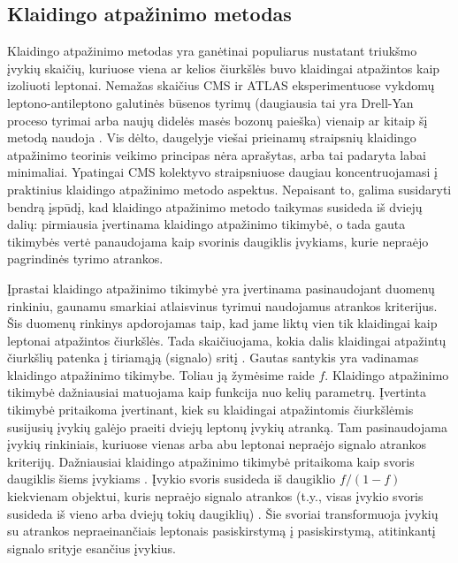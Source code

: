 \documentclass[a4paper, 12pt, oneside]{article}
\begin{document}
\subsection{Klaidingo atpažinimo metodas}
Klaidingo atpažinimo metodas yra ganėtinai populiarus nustatant triukšmo įvykių skaičių, kuriuose viena ar kelios čiurkšlės
buvo klaidingai atpažintos kaip izoliuoti leptonai.
Nemažas skaičius CMS ir ATLAS eksperimentuose vykdomų leptono-antileptono galutinės būsenos tyrimų (daugiausia tai yra
Drell-Yan proceso tyrimai arba naujų didelės masės bozonų paieška) vienaip ar kitaip šį metodą naudoja
\cite{DY_CMS2011, DY_CMS2013, DY_ATLAS2013, DY_CMS2015, DY_ATLAS2016, DY_CMS2019, Z'_ATLAS2011, Z'_CMS2011, Z'_CMS2012,
Z'_CMS2013, Z'_ATLAS2014, Z'_CMS2015, Z'_CMS2017, Z'_CMS2018}.
Vis dėlto, daugelyje viešai prieinamų straipsnių klaidingo atpažinimo teorinis veikimo principas nėra aprašytas, arba tai padaryta
labai minimaliai.
Ypatingai CMS kolektyvo straipsniuose daugiau koncentruojamasi į praktinius klaidingo atpažinimo metodo aspektus.
Nepaisant to, galima susidaryti bendrą įspūdį, kad klaidingo atpažinimo metodo taikymas susideda iš dviejų dalių:
pirmiausia įvertinama klaidingo atpažinimo tikimybė, o tada gauta tikimybės vertė panaudojama kaip svorinis
daugiklis įvykiams, kurie nepraėjo pagrindinės tyrimo atrankos.

Įprastai klaidingo atpažinimo tikimybė yra įvertinama pasinaudojant duomenų rinkiniu, gaunamu smarkiai atlaisvinus
tyrimui naudojamus atrankos kriterijus.
Šis duomenų rinkinys apdorojamas taip, kad jame liktų vien tik klaidingai kaip leptonai atpažintos čiurkšlės.
Tada skaičiuojama, kokia dalis klaidingai atpažintų čiurkšlių patenka į tiriamąją (signalo) sritį
\cite{DY_ATLAS2016, Z'_ATLAS2011, Z'_CMS2011, Z'_ATLAS2014, Z'_CMS2015}.
Gautas santykis yra vadinamas klaidingo atpažinimo tikimybe.
Toliau ją žymėsime raide $f$.
Klaidingo atpažinimo tikimybė dažniausiai matuojama kaip funkcija nuo kelių parametrų.
Įvertinta tikimybė pritaikoma įvertinant, kiek su klaidingai atpažintomis čiurkšlėmis susijusių įvykių
galėjo praeiti dviejų leptonų įvykių atranką.
Tam pasinaudojama įvykių rinkiniais, kuriuose vienas arba abu leptonai nepraėjo signalo atrankos kriterijų.
Dažniausiai klaidingo atpažinimo tikimybė pritaikoma kaip svoris daugiklis šiems įvykiams \cite{Z'_ATLAS2011, Z'_CMS2011, Z'_CMS2015}.
Įvykio svoris susideda iš daugiklio $f/(1-f)$ kiekvienam objektui, kuris nepraėjo signalo atrankos (t.y., visas įvykio svoris
susideda iš vieno arba dviejų tokių daugiklių) \cite{Z'_CMS2015}.
Šie svoriai transformuoja įvykių su atrankos nepraeinančiais leptonais pasiskirstymą į pasiskirstymą, atitinkantį signalo
srityje esančius įvykius.
\end{document}
